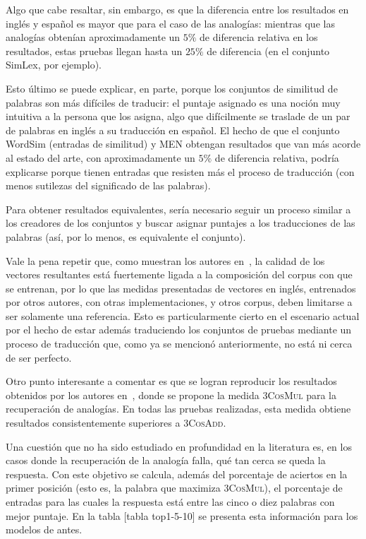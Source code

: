 Algo que cabe resaltar, sin embargo, es que la diferencia entre los resultados en inglés y español
es mayor que para el caso de las analogías: mientras que las analogías obtenían aproximadamente un
$5\%$ de diferencia relativa en los resultados, estas pruebas llegan hasta un $25\%$ de diferencia
(en el conjunto SimLex, por ejemplo).

Esto último se puede explicar, en parte, porque los conjuntos de similitud de palabras son más
difíciles de traducir: el puntaje asignado es una noción muy intuitiva a la persona que los asigna,
algo que difícilmente se traslade de un par de palabras en inglés a su traducción en español. El
hecho de que el conjunto WordSim (entradas de similitud) y MEN obtengan resultados que van más
acorde al estado del arte, con aproximadamente un $5\%$ de diferencia relativa, podría explicarse
porque tienen entradas que resisten más el proceso de traducción (con menos sutilezas del
significado de las palabras).

Para obtener resultados equivalentes, sería necesario seguir un proceso similar a los creadores de
los conjuntos y buscar asignar puntajes a los traducciones de las palabras (así, por lo menos, es
equivalente el conjunto).

Vale la pena repetir que, como muestran los autores en~\cite{Levy2015}, la calidad de los vectores
resultantes está fuertemente ligada a la composición del corpus con que se entrenan, por lo que las
medidas presentadas de vectores en inglés, entrenados por otros autores, con otras implementaciones,
y otros corpus, deben limitarse a ser solamente una referencia. Esto es particularmente cierto en el
escenario actual por el hecho de estar además traduciendo los conjuntos de pruebas mediante un
proceso de traducción que, como ya se mencionó anteriormente, no está ni cerca de ser perfecto.

Otro punto interesante a comentar es que se logran reproducir los resultados obtenidos por los
autores en~\cite{Levy2014b}, donde se propone la medida \textsc{3CosMul} para la recuperación de
analogías. En todas las pruebas realizadas, esta medida obtiene resultados consistentemente
superiores a \textsc{3CosAdd}.

Una cuestión que no ha sido estudiado en profundidad en la literatura es, en los casos donde la
recuperación de la analogía falla, qué tan cerca se queda la respuesta. Con este objetivo se
calcula, además del porcentaje de aciertos en la primer posición (esto es, la palabra que maximiza
\textsc{3CosMul}), el porcentaje de entradas para las cuales la respuesta está entre las cinco o
diez palabras con mejor puntaje. En la tabla [tabla top1-5-10] se presenta esta información para los
modelos de antes.


